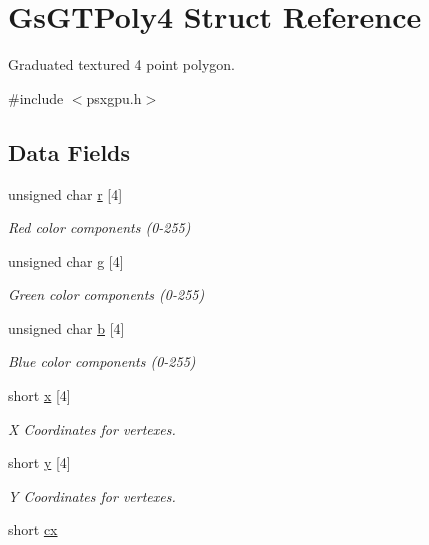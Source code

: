 \hypertarget{structGsGTPoly4}{}\section{Gs\+G\+T\+Poly4 Struct Reference}
\label{structGsGTPoly4}


Graduated textured 4 point polygon.  




{\ttfamily \#include $<$psxgpu.\+h$>$}

\subsection*{Data Fields}
\begin{DoxyCompactItemize}
\item 
unsigned char \hyperlink{structGsGTPoly4_a9982197b865cb32188c6ea8f581ebbe2}{r} \mbox{[}4\mbox{]}
\begin{DoxyCompactList}\small\item\em Red color components (0-\/255) \end{DoxyCompactList}\item 
unsigned char \hyperlink{structGsGTPoly4_af9a458ed7980f31f46f7dd4108ed896e}{g} \mbox{[}4\mbox{]}
\begin{DoxyCompactList}\small\item\em Green color components (0-\/255) \end{DoxyCompactList}\item 
unsigned char \hyperlink{structGsGTPoly4_aa1759d4a006f560d2588117df89c7963}{b} \mbox{[}4\mbox{]}
\begin{DoxyCompactList}\small\item\em Blue color components (0-\/255) \end{DoxyCompactList}\item 
short \hyperlink{structGsGTPoly4_ae9d7d0c778bc80e6e689dad2ccae3fe3}{x} \mbox{[}4\mbox{]}
\begin{DoxyCompactList}\small\item\em X Coordinates for vertexes. \end{DoxyCompactList}\item 
short \hyperlink{structGsGTPoly4_a979238f05c29e735ea951c8758c106d3}{y} \mbox{[}4\mbox{]}
\begin{DoxyCompactList}\small\item\em Y Coordinates for vertexes. \end{DoxyCompactList}\item 
short \hyperlink{structGsGTPoly4_a2a7f575dadefd9b5dcd94425ea00dc01}{cx}

\end{DoxyCompactItemize}
